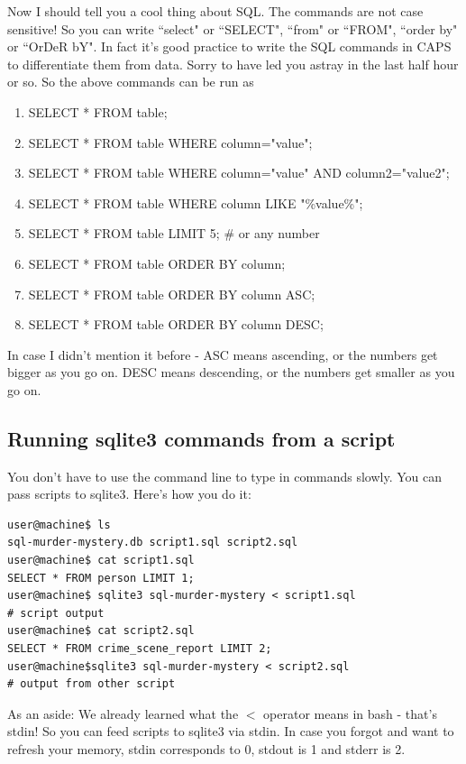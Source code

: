 \documentclass[12pt,a4paper]{article}
\begin{document}
Now I should tell you a cool thing about SQL. The commands are not case
sensitive! So you can write ``select" or ``SELECT", ``from" or ``FROM", ``order by" or ``OrDeR
bY". In fact it's good practice to write the SQL commands in CAPS to
differentiate them from data. Sorry to have led you astray in the last half hour
or so. So the above commands can be run as 

\begin{enumerate}
\item SELECT * FROM table;
\item SELECT * FROM table WHERE column="value";
\item SELECT * FROM table WHERE column="value" AND column2="value2";
\item SELECT * FROM table WHERE column LIKE "\%value\%";
\item SELECT * FROM table LIMIT 5; \# or any number
\item SELECT * FROM table ORDER BY column;
\item SELECT * FROM table ORDER BY column ASC;
\item SELECT * FROM table ORDER BY column DESC;
\end{enumerate}

In case I didn't mention it before - ASC means ascending, or the numbers get
bigger as you go on. DESC means descending, or the numbers get smaller as you go
on.

\subsection{Running sqlite3 commands from a script}
You don't have to use the command line to type in commands slowly. You can pass
scripts to sqlite3. Here's how you do it:

\begin{lstlisting}[style=term]
user@machine$ ls
sql-murder-mystery.db script1.sql script2.sql
user@machine$ cat script1.sql
SELECT * FROM person LIMIT 1;
user@machine$ sqlite3 sql-murder-mystery < script1.sql
# script output
user@machine$ cat script2.sql
SELECT * FROM crime_scene_report LIMIT 2;
user@machine$sqlite3 sql-murder-mystery	< script2.sql
# output from other script
\end{lstlisting}

As an aside: We already learned what the $<$ operator means in bash - that's stdin! So you
can feed scripts to sqlite3 via stdin. In case you forgot and want to refresh
your memory, stdin corresponds to 0, stdout is 1 and stderr is 2.
\end{document}

